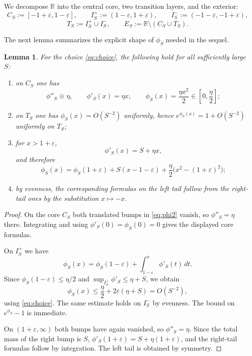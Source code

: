 \documentclass[11pt]{amsart}
\newtheorem{lemma}[theorem]{Lemma}
\theoremstyle{remark}
\newcommand{\R}{\mathbb R}
\begin{document}
We decompose $\R$ into the central core, two transition layers, and the
exterior:
\[
  C_S:=[-1+\varepsilon,1-\varepsilon],
  \qquad
  I_S^+:=(1-\varepsilon,1+\varepsilon),
  \qquad
  I_S^-:=(-1-\varepsilon,-1+\varepsilon),
\]
\[
  T_S:=I_S^+\cup I_S^-,
  \qquad
  E_S:=\R\setminus(C_S\cup T_S).
\]

The next lemma summarizes the explicit shape of $\phi_S$ needed in the sequel.

\begin{lemma}\label{lem:profile}
For the choice \eqref{eq:choice}, the following hold for all sufficiently large
$S$:
\begin{enumerate}
\item on $C_S$ one has
  \[
    \phi''_S\equiv\eta,
    \qquad
    \phi'_S(x)=\eta x,
    \qquad
    \phi_S(x)=\frac{\eta x^2}{2}\in\left[0,\frac{\eta}{2}\right];
  \]
\item on $T_S$ one has $\phi_S(x)=O(S^{-2})$ uniformly, hence
  $e^{\phi_S(x)}=1+O(S^{-2})$ uniformly on $T_S$;
\item for $x>1+\varepsilon$,
  \[
    \phi'_S(x)=S+\eta x,
  \]
  and therefore
  \[
    \phi_S(x)
    =\phi_S(1+\varepsilon)
     +S(x-1-\varepsilon)
     +\frac{\eta}{2}\bigl(x^2-(1+\varepsilon)^2\bigr);
  \]
\item by evenness, the corresponding formulas on the left tail follow from the
  right-tail ones by the substitution $x\mapsto -x$.
\end{enumerate}
\end{lemma}

\begin{proof}
On the core $C_S$ both translated bumps in \eqref{eq:phi2} vanish, so
$\phi''_S=\eta$ there. Integrating and using $\phi'_S(0)=\phi_S(0)=0$ gives
the displayed core formulas.

On $I_S^+$ we have
\[
  \phi_S(x)
  =\phi_S(1-\varepsilon)+\int_{1-\varepsilon}^x\phi'_S(t)\,dt.
\]
Since $\phi_S(1-\varepsilon)\le \eta/2$ and
$\sup_{I_S^+}\phi'_S\le \eta+S$, we obtain
\[
  \phi_S(x)\le \frac{\eta}{2}+2\varepsilon(\eta+S)=O(S^{-2}),
\]
using \eqref{eq:choice}. The same estimate holds on $I_S^-$ by evenness. The
bound on $e^{\phi_S}-1$ is immediate.

On $(1+\varepsilon,\infty)$ both bumps have again vanished, so
$\phi''_S=\eta$. Since the total mass of the right bump is $S$,
$\phi'_S(1+\varepsilon)=S+\eta(1+\varepsilon)$, and the right-tail formulas
follow by integration. The left tail is obtained by symmetry.
\end{proof}
\end{document}
